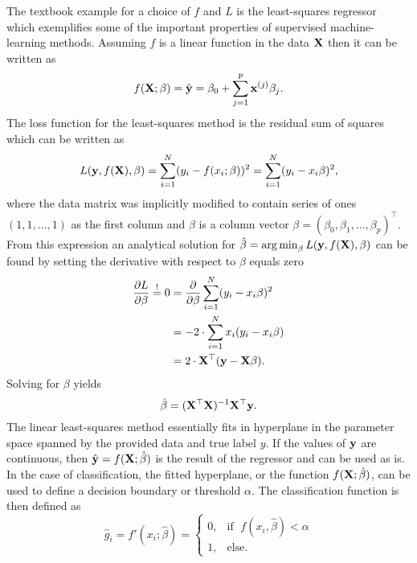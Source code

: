 The textbook example for a choice of $f$ and $L$ is the least-squares regressor~\cite[11]{hasties} which exemplifies some of the important properties 
of supervised machine-learning methods.
Assuming $f$ is a linear function in the data $\mathbf{X}$ then it can be written as 
\begin{equation*}
    f(\mathbf{X}; \beta) = \hat{\mathbf{{y}}} =  \beta_0 + \sum_{j=1}^p \mathbf{x}^{(j)} \beta_j.
\end{equation*}
The loss function for the least-squares method is the residual sum of squares which can be written as
\begin{equation*}
    L(\mathbf{y}, f(\mathbf{X}), \beta) = \sum_{i=1}^N (y_i - f(x_i; \beta))^2 = \sum_{i=1}^N (y_i - x_i \beta)^2,
\end{equation*}
where the data matrix was implicitly modified to contain series of ones $(1, 1,...,1)$ as the first column and $\beta$ is a column vector $\beta=(\beta_0, \beta_1, \ldots, \beta_p)^\top$.
From this expression an analytical solution for $\hat{\beta} = \operatorname*{arg\,min}_{\beta} L(\mathbf{y}, f(\mathbf{X}), \beta)$
can be found by setting the derivative with respect to $\beta$ equals zero
\begin{align*}
    \frac{\partial L}{\partial \beta} \stackrel{!}{=} 0 &= \frac{\partial}{\partial \beta} \sum_{i=1}^N (y_i - x_i \beta)^2 \\
                                      &=  -2 \cdot \sum_{i=1}^N x_i (y_i - x_i \beta)  \\
                                      &=  2 \cdot {\mathbf{X}}^{\top} (\mathbf{y} - \mathbf{X} \beta).
\end{align*}
Solving for $\beta$ yields 
\begin{equation*}
    \hat{\beta} = ({\mathbf{X}}^\top \mathbf{X})^{-1} {\mathbf{X}}^\top \mathbf{y}.
\end{equation*}
The linear least-squares method essentially fits in hyperplane in the parameter space spanned by the provided data and true label $y$.
If the values of $\mathbf{y}$ are continuous, then $\hat{\mathbf{{y}}} = f(\mathbf{X}; \hat{\beta})$ is the result of the regressor and can be used as is.
In the case of classification, the fitted hyperplane, or the function $f(\mathbf{X}; \hat{\beta})$, can be used to define a decision boundary or threshold $\alpha$. 
The classification function is then defined as 
\begin{equation*}
    \hat{g}_i = f'(x_i; \hat{\beta}) = \begin{cases}
        0, & \text{if } \; f(x_i, \hat{\beta}) < \alpha \\
        1, & \text{else.}
    \end{cases}    
\end{equation*}
